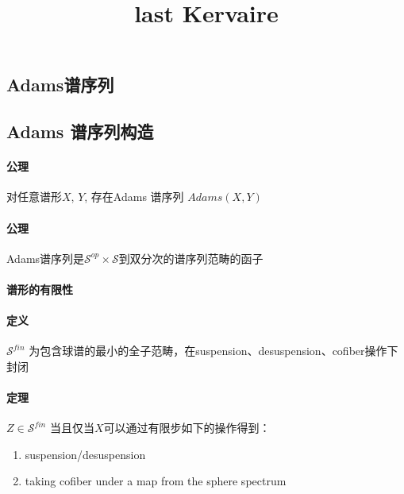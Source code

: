 \documentclass[12pt,a4paper]{article}
\title{last Kervaire}
\author{}
\begin{document}
\sffamily
\maketitle
\thispagestyle{empty}

\abstract{}
\tableofcontents

\large

\begin{sloppy}



\section{Adams谱序列}

\subsection{Adams 谱序列构造}

\paragraph{公理} 对任意谱形$X$, $Y$, 存在Adams 谱序列 $Adams(X,Y)$

\paragraph{公理}Adams谱序列是$\mathcal{S}^{op}\times \mathcal{S}$到双分次的谱序列范畴的函子

\paragraph{谱形的有限性}

\paragraph{定义} $\mathcal{S}^{fin}$ 为包含球谱的最小的全子范畴，在suspension、desuspension、cofiber操作下封闭

\paragraph{定理}  $Z\in\mathcal{S}^{fin}$ 当且仅当$X$可以通过有限步如下的操作得到：\begin{enumerate}
    \item suspension/desuspension
    \item taking cofiber under a map from the sphere spectrum
\end{enumerate}


\end{sloppy}
\end{document}
